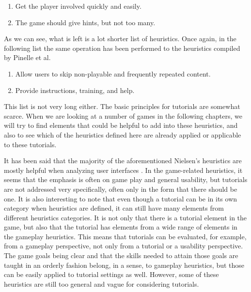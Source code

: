 \begin{enumerate}
	\item Get the player involved quickly and easily.
	\item The game should give hints, but not too many.
\end{enumerate}

As we can see, what is left is a lot shorter list of heuristics. Once again, in the following list the same operation has been performed to the heuristics compiled by Pinelle et al. \cite{Pinelle2008}

\begin{enumerate}
	\item Allow users to skip non-playable and frequently repeated content.
	\item Provide instructions, training, and help.
\end{enumerate}

This list is not very long either. The basic principles for tutorials are somewhat scarce. When we are looking at a number of games in the following chapters, we will try to find elements that could be helpful to add into these heuristics, and also to see which of the heuristics defined here are already applied or applicable to these tutorials.

It has been said that the majority of the aforementioned Nielsen's heuristics are mostly helpful when analyzing user interfaces \cite{Federoff2002}. In the game-related heuristics, it seems that the emphasis is often on game play and general usability, but tutorials are not addressed very specifically, often only in the form that there should be one. It is also interesting to note that even though a tutorial can be in its own category when heuristics are defined, it can still have many elements from different heuristics categories. It is not only that there is a tutorial element in the game, but also that the tutorial has elements from a wide range of elements in the gameplay heuristics. This means that tutorials can be evaluated, for example, from a gameplay perspective, not only from a tutorial or a usability perspective. The game goals being clear and that the skills needed to attain those goals are taught in an orderly fashion belong, in a sense, to gameplay heuristics, but those can be easily applied to tutorial settings as well. However, some of these heuristics are still too general and vague for considering tutorials. 

